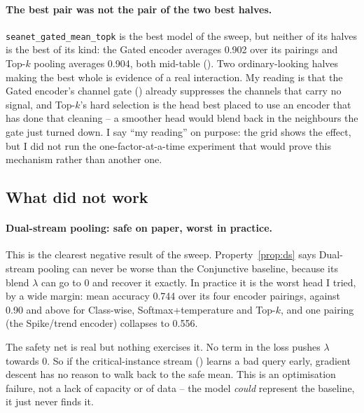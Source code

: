 \paragraph{The best pair was not the pair of the two best halves.}
\texttt{seanet\_gated\_mean\_topk} is the best model of the sweep, but neither of its halves is the
best of its kind: the Gated encoder averages 0.902 over its pairings and Top-$k$ pooling averages
0.904, both mid-table (). Two ordinary-looking halves making the best whole
is evidence of a real interaction. My reading is that the Gated encoder's channel gate
() already suppresses the channels that carry no signal, and Top-$k$'s hard selection
is the head best placed to use an encoder that has done that cleaning -- a smoother head would blend
back in the neighbours the gate just turned down. I say ``my reading'' on purpose: the grid shows
the effect, but I did not run the one-factor-at-a-time experiment that would prove this mechanism
rather than another one.

\subsection{What did not work}
\label{sec:disc:negative}

\paragraph{Dual-stream pooling: safe on paper, worst in practice.}
This is the clearest negative result of the sweep. Property~\ref{prop:ds} says Dual-stream pooling
can never be worse than the Conjunctive baseline, because its blend $\lambda$ can go to 0 and
recover it exactly. In practice it is the worst head I tried, by a wide margin: mean \webtraffic{}
accuracy 0.744 over its four encoder pairings, against 0.90 and above for Class-wise,
Softmax+temperature and Top-$k$, and one pairing (the Spike/trend encoder) collapses to 0.556.

The safety net is real but nothing exercises it. No term in the loss pushes $\lambda$ towards 0. So
if the critical-instance stream () learns a bad query early, gradient descent
has no reason to walk back to the safe mean. This is an optimisation failure, not a lack of
capacity or of data -- the model \emph{could} represent the baseline, it just never finds it.

